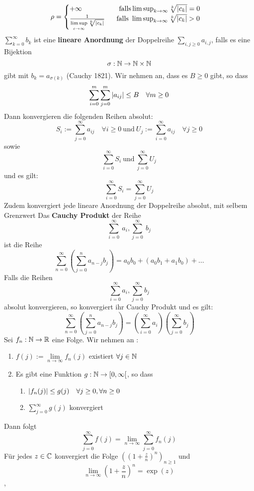     \[\rho = \begin{cases}
        +\infty \quad \quad \quad \quad \quad \  \text{falls} \limsup_{k \rightarrow \infty} \sqrt[k]{\left\lvert c_k \right\rvert} = 0 \\
        \frac{1}{\limsup\limits_{c \rightarrow \infty} \sqrt[k]{\left|c_{k}\right|}}  \quad \  \ \text{falls } \limsup_{k \rightarrow \infty} \sqrt[k]{\left\lvert c_k \right\rvert} > 0
        \end{cases}\]
\Def[2.58] \(\sum_{k=0}^{\infty} b_k \) ist eine \textbf{lineare Anordnung} der Doppelreihe \(\sum_{i,j \geq 0} a_{i,j}\), falls es eine Bijektion \[\sigma : \mathbb{N} \rightarrow \mathbb{N} \times \mathbb{N} \] gibt mit \(b_k = a_{\sigma(k)}\) \newline
\Satz[2.59] (Cauchy 1821). Wir nehmen an, dass es \(B \geq 0\) gibt, so dass
\[\sum_{i=0}^{m}\sum_{j=0}^{m}\left\lvert a_{ij} \right\rvert \leq B \quad \forall m \geq 0\]
Dann konvergieren die folgenden Reihen absolut:
\[S_i := \sum_{j=0}^\infty a_{ij} \quad \forall i \geq 0 \  \text{und} \  U_j := \sum_{i=0}^{\infty}a_{ij} \quad \forall j \geq 0\]
sowie
\[\sum_{i=0}^\infty S_i \ \text{und} \ \sum_{j=0}^\infty U_j\]
und es gilt:
\[\sum_{i=0}^\infty S_i  =  \sum_{j=0}^\infty U_j\]
Zudem konvergiert jede lineare Anordnung der Doppelreihe absolut, mit selbem Grenzwert \newline
\Def[2.60] Das \textbf{Cauchy Produkt} der Reihe
\[\sum_{i=0}^\infty\ a_i, \sum_{j=0}^\infty\ b_j\]
ist die Reihe
\[\sum_{n=0}^\infty ( \sum_{j=0}^n a_{n-j}b_j )= a_0b_0 + (a_0b_1 + a_1b_0) + \dots \] \newline
\Satz[2.62] Falls die Reihen
\[\sum_{i=0}^\infty a_i , \sum_{j=0}^\infty b_j\]
absolut konvergieren, so konvergiert ihr Cauchy Produkt und es gilt:
\[\sum_{n=0}^{\infty} (\sum_{j=0}^n a_{n-j}b_j) = (\sum_{i=0}^{\infty} a_i) (\sum_{j=0}^{\infty} b_j)\]
\Satz[2.64]  Sei \( f_n : \mathbb{N} \rightarrow \mathbb{R} \) eine Folge. Wir nehmen an :
\begin{enumerate}
    \item [1] \(f(j) := \lim\limits_{n \rightarrow \infty} f_n(j)\) existiert \(\forall j \in \mathbb{N}\)
    \item [2] Es gibt eine Funktion \(g: \mathbb{N} \rightarrow [0, \infty[\), so dass
    \begin {enumerate}
    \item [2.1] \(\left\lvert f_n(j) \right\rvert \leq g(j) \quad \forall j \geq 0, \forall n \geq 0\)
    \item [2.2] \(\sum_{j=0}^\infty g(j)\) konvergiert
    \end{enumerate}
\end{enumerate}
Dann folgt
\[\sum_{j=0}^\infty f(j) = \lim\limits_{n \rightarrow \infty} \sum_{j=0}^\infty f_n(j)\]
\Korollar[2.65] Für jedes \(z \in \mathbb{C} \) konvergiert die Folge \(((1 + \frac{z}{n})^n)_{n \geq 1}\) und
\[\lim\limits_{n \rightarrow \infty} (1 + \frac{z}{n})^n = \exp(z)\]
\sep